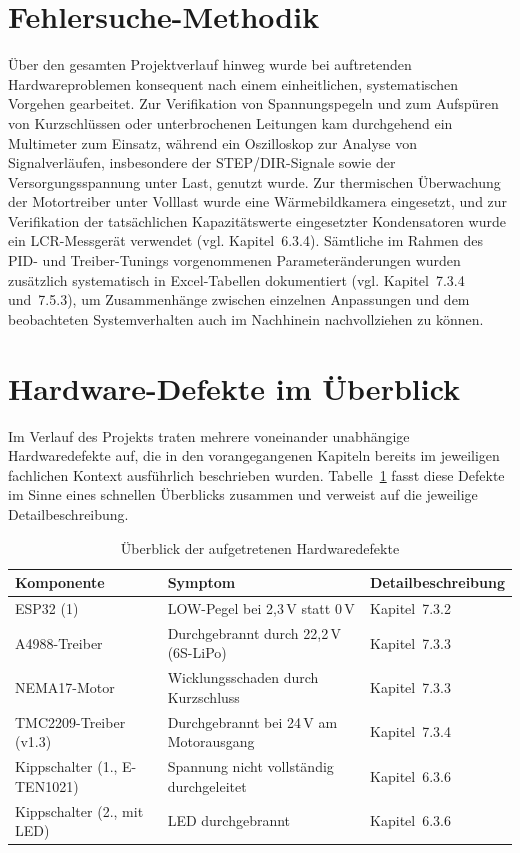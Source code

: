 \documentclass[12pt,ngerman,numbers=noenddot,abstracton,headsepline]{scrreprt}
\begin{document}
\section{Fehlersuche-Methodik}
\label{sec:fehlersuche_methodik}

Über den gesamten Projektverlauf hinweg wurde bei auftretenden Hardwareproblemen konsequent nach einem einheitlichen, systematischen Vorgehen gearbeitet. Zur Verifikation von Spannungspegeln und zum Aufspüren von Kurzschlüssen oder unterbrochenen Leitungen kam durchgehend ein Multimeter zum Einsatz, während ein Oszilloskop zur Analyse von Signalverläufen, insbesondere der STEP/DIR-Signale sowie der Versorgungsspannung unter Last, genutzt wurde. Zur thermischen Überwachung der Motortreiber unter Volllast wurde eine Wärmebildkamera eingesetzt, und zur Verifikation der tatsächlichen Kapazitätswerte eingesetzter Kondensatoren wurde ein LCR-Messgerät verwendet (vgl. Kapitel~6.3.4). Sämtliche im Rahmen des PID- und Treiber-Tunings vorgenommenen Parameteränderungen wurden zusätzlich systematisch in Excel-Tabellen dokumentiert (vgl. Kapitel~7.3.4 und~7.5.3), um Zusammenhänge zwischen einzelnen Anpassungen und dem beobachteten Systemverhalten auch im Nachhinein nachvollziehen zu können.

\section{Hardware-Defekte im Überblick}
\label{sec:hardware_defekte_ueberblick}

Im Verlauf des Projekts traten mehrere voneinander unabhängige Hardwaredefekte auf, die in den vorangegangenen Kapiteln bereits im jeweiligen fachlichen Kontext ausführlich beschrieben wurden. Tabelle~\ref{tab:defekte_uebersicht} fasst diese Defekte im Sinne eines schnellen Überblicks zusammen und verweist auf die jeweilige Detailbeschreibung.

\begin{table}[h]
    \centering
    \caption{Überblick der aufgetretenen Hardwaredefekte}
    \label{tab:defekte_uebersicht}
    \begin{tabular}{|l|l|l|}
        \hline
        \textbf{Komponente} & \textbf{Symptom} & \textbf{Detailbeschreibung} \\
        \hline
        ESP32 (1) & LOW-Pegel bei 2,3\,V statt 0\,V & Kapitel~7.3.2 \\
        \hline
        A4988-Treiber & Durchgebrannt durch 22,2\,V (6S-LiPo) & Kapitel~7.3.3 \\
        \hline
        NEMA17-Motor & Wicklungsschaden durch Kurzschluss & Kapitel~7.3.3 \\
        \hline
        TMC2209-Treiber (v1.3) & Durchgebrannt bei 24\,V am Motorausgang & Kapitel~7.3.4 \\
        \hline
        Kippschalter (1., E-TEN1021) & Spannung nicht vollständig durchgeleitet & Kapitel~6.3.6 \\
        \hline
        Kippschalter (2., mit LED) & LED durchgebrannt & Kapitel~6.3.6 \\
        \hline
    \end{tabular}
\end{table}
\end{document}
